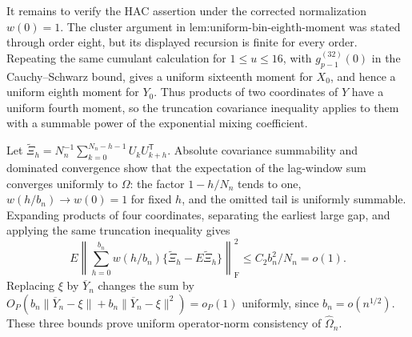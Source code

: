 It remains to verify the HAC assertion under the corrected normalization \(w(0)=1\).  The cluster argument in \(\text{lem:uniform-bin-eighth-moment}\) was stated through order eight, but its displayed recursion is finite for every order.  Repeating the same cumulant calculation for \(1\leq u\leq16\), with \(g_{p-1}^{(32)}(0)\) in the Cauchy--Schwarz bound, gives a uniform sixteenth moment for \(X_0\), and hence a uniform eighth moment for \(Y_0\).  Thus products of two coordinates of \(Y\) have a uniform fourth moment, so the truncation covariance inequality applies to them with a summable power of the exponential mixing coefficient.

Let \(\widetilde\Xi_h=N_n^{-1}\sum_{k=0}^{N_n-h-1}U_kU_{k+h}^{\mathsf T}\).  Absolute covariance summability and dominated convergence show that the expectation of the lag-window sum converges uniformly to \(\Omega\): the factor \(1-h/N_n\) tends to one, \(w(h/b_n)\to w(0)=1\) for fixed \(h\), and the omitted tail is uniformly summable.  Expanding products of four coordinates, separating the earliest large gap, and applying the same truncation inequality gives
\[
 E\left\|\sum_{h=0}^{b_n}w(h/b_n)\{\widetilde\Xi_h-E\widetilde\Xi_h\}\right\|_{\mathrm F}^2
 \leq C_2b_n^2/N_n=o(1).
\]
Replacing \(\xi\) by \(\overline Y_n\) changes the sum by
\(O_P(b_n\|\overline Y_n-\xi\|+b_n\|\overline Y_n-\xi\|^2)=o_P(1)\) uniformly, since \(b_n=o(n^{1/2})\).  These three bounds prove uniform operator-norm consistency of \(\widehat\Omega_n\).